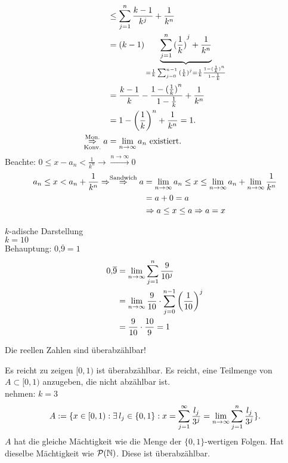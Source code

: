 \documentclass[../ana1.tex]{subfiles}
\begin{document}
\begin{bsp}
\begin{align*}
		&\leq \sum_{j=1}^{n} \frac{k-1}{k^j} + \frac{1}{k^n}\\
		&= (k-1)\underbrace{ \sum_{j=1}^{n} {( \frac{1}{k})}^j + \frac{1}{k^n} }_{= \frac{1}{k} \sum_{j=0}^{n-1} {(\frac{1}{k})}^j = \frac{1}{k} \frac{1-{(\frac{1}{k})}^n}{1-\frac{1}{k}} }\\
		&=\frac{k-1}{k}-\frac{1-{(\frac{1}{k})}^n}{1-\frac{1}{k}} + \frac{1}{k^n}\\
		&= 1- {\left(\frac{1}{k}\right)}^n + \frac{1}{k^n} = 1.\\
		\overset{\text{Mon.}}{\underset{\text{Konv.}}{\Rightarrow}} a &= \lim\limits_{n\rightarrow\infty} a_n \text{ existiert.}\\
	\end{align*}
	Beachte: \(0 \leq x-a_n < \frac{1}{k^n} \rightarrow\overset{n \rightarrow \infty}{\rightarrow} 0\) \\	 
	\begin{align*}
		a_n \leq x < a_n + \frac{1}{k^n} \Rightarrow\overset{\text{Sandwich}}{\Rightarrow}
		a &= \lim\limits_{n\rightarrow\infty} a_n \leq x \leq \lim\limits_{n\rightarrow\infty} a_n + \lim\limits_{n\rightarrow\infty} \frac{1}{k^n}\\
		&= a + 0 = a\\
		&\Rightarrow a \leq x \leq a \Rightarrow a = x
	\end{align*}
\end{bsp}
\begin{bsp}
	\(k\)-adische Darstellung\\
	\(k = 10\) \\
	Behauptung: \(0\text{,}\overline{9} = 1\)
	\begin{align*}
		0\text{,}\overline{9} &= \lim\limits_{n\rightarrow\infty} \sum_{j=1}^{n} \frac{9}{10^j}\\
		&=\lim\limits_{n\rightarrow\infty} \frac{9}{10}\cdot \sum_{j=0}^{n-1}{\left(\frac{1}{10}\right)}^j\\
		&=\frac{9}{10}\cdot\frac{10}{9} = 1
	\end{align*}
\end{bsp}
\begin{kor}
	Die reellen Zahlen sind überabzählbar!
\end{kor}
\begin{bew}
	Es reicht zu zeigen \( [0,1) \) ist überabzählbar. Es reicht, eine Teilmenge von \(A \subset [0,1) \) anzugeben, die nicht abzählbar ist.\\
	nehmen: \(k=3\)
	\[ A:= \{ x\in[0,1) : \exists l_j \in \{0,1 \}: x = \sum_{j=1}^{\infty} \frac{l_j}{3^j} = \limes{n} \sum_{j=1}^{n}\frac{l_j}{3^j} \}. \]
	\(A\) hat die gleiche Mächtigkeit wie die Menge der \( \{0,1\} \)-wertigen Folgen. Hat dieselbe Mächtigkeit wie \(\mathcal{P}(\mathbb{N})\). Diese ist überabzählbar.
\end{bew}
\end{document}
